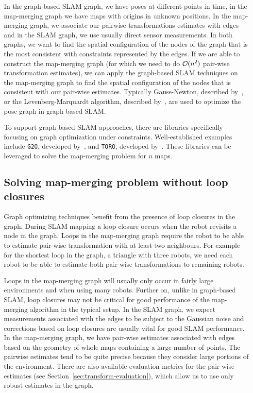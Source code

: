 In the graph-based \gls{SLAM} graph, we have poses at different points in time, in the map-merging graph we have maps with origins in unknown positions. In the map-merging graph, we associate our pairwise transformations estimates with edges and in the \gls{SLAM} graph, we use usually direct sensor measurements. In both graphs, we want to find the spatial configuration of the nodes of the graph that is the most consistent with constraints represented by the edges. If we are able to construct the map-merging graph (for which we need to do $\operatorname{\mathcal{O}}(n^2)$ pair-wise transformation estimates), we can apply the graph-based \gls{SLAM} techniques on the map-merging graph to find the spatial configuration of the nodes that is consistent with our pair-wise estimates. Typically Gauss-Newton, described by~\citet[ch.~3]{fletcher2013practical}, or the Levenberg-Marquardt algorithm, described by~\citet{more1978levmarq}, are used to optimize the pose graph in graph-based \gls{SLAM}.

To support graph-based \gls{SLAM} approaches, there are libraries specifically focusing on graph optimization under constraints. Well-established examples include \texttt{G2O}, developed by~\citet{kummerle2011g2o}, and \texttt{TORO}, developed by~\citet{grisetti2007toro}. These libraries can be leveraged to solve the map-merging problem for $n$ maps.

\subsection{Solving map-merging problem without loop closures}

Graph optimizing techniques benefit from the presence of loop closures in the graph. During \gls{SLAM} mapping a loop closure occurs when the robot revisits a node in the graph. Loops in the map-merging graph require the robot to be able to estimate pair-wise transformation with at least two neighbours. For example for the shortest loop in the graph, a triangle with three robots, we need each robot to be able to estimate both pair-wise transformations to remaining robots.

Loops in the map-merging graph will usually only occur in fairly large environments and when using many robots. Further on, unlike in graph-based \gls{SLAM}, loop closures may not be critical for good performance of the map-merging algorithm in the typical setup. In the \gls{SLAM} graph, we expect measurements associated with the edges to be subject to the Gaussian noise and corrections based on loop closures are usually vital for good \gls{SLAM} performance. In the map-merging graph, we have pair-wise estimates associated with edges based on the geometry of whole maps containing a large number of points. The pairwise estimates tend to be quite precise because they consider large portions of the environment. There are also available evaluation metrics for the pair-wise estimates (see Section~\ref{sec:transform-evaluation}), which allow us to use only robust estimates in the graph.

